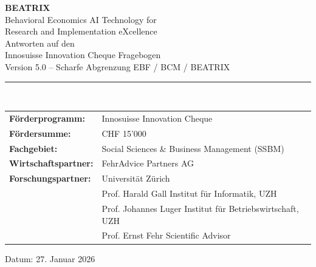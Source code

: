 \documentclass[11pt,a4paper]{article}
\begin{document}

\begin{titlepage}
\centering
\vspace*{2cm}

{\Huge\bfseries\color{fehrblue} BEATRIX}\\[0.5cm]
{\Large Behavioral Economics AI Technology for\\Research and Implementation eXcellence}\\[2cm]

{\LARGE Antworten auf den\\Innosuisse Innovation Cheque Fragebogen}\\[1cm]

{\large Version 5.0 -- Scharfe Abgrenzung EBF / BCM / BEATRIX}\\[2cm]

\rule{0.8\textwidth}{0.5pt}\\[1.5cm]

\begin{tabular}{ll}
\textbf{Förderprogramm:} & Innosuisse Innovation Cheque \\[0.3cm]
\textbf{Fördersumme:} & CHF 15'000 \\[0.3cm]
\textbf{Fachgebiet:} & Social Sciences \& Business Management (SSBM) \\[0.3cm]
\textbf{Wirtschaftspartner:} & FehrAdvice Partners AG \\[0.3cm]
\textbf{Forschungspartner:} & Universität Zürich \\[0.3cm]
& Prof. Harald Gall \quad Institut für Informatik, UZH \\
& Prof. Johannes Luger \quad Institut für Betriebswirtschaft, UZH \\
& Prof. Ernst Fehr \quad Scientific Advisor \\
\end{tabular}

\vfill


\vfill

{\large Datum: 27. Januar 2026}

\end{titlepage}
\end{document}
